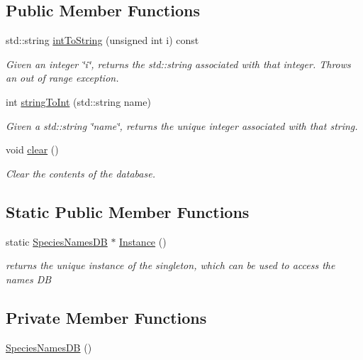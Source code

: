 \subsection*{Public Member Functions}
\begin{DoxyCompactItemize}
\item 
std\-::string \hyperlink{classchem_1_1SpeciesNamesDB_ab4bd884d41961450ebe3d4d9564893a9}{int\-To\-String} (unsigned int i) const 
\begin{DoxyCompactList}\small\item\em Given an integer \char`\"{}i\char`\"{}, returns the std\-::string associated with that integer. Throws an out of range exception. \end{DoxyCompactList}\item 
int \hyperlink{classchem_1_1SpeciesNamesDB_acbb96b1e9cc8fee95c5b5f1b464cd5bd}{string\-To\-Int} (std\-::string name)
\begin{DoxyCompactList}\small\item\em Given a std\-::string \char`\"{}name\char`\"{}, returns the unique integer associated with that string. \end{DoxyCompactList}\item 
void \hyperlink{classchem_1_1SpeciesNamesDB_a08f8ec17dd512073c80ac83064d9f2b9}{clear} ()
\begin{DoxyCompactList}\small\item\em Clear the contents of the database. \end{DoxyCompactList}\end{DoxyCompactItemize}
\subsection*{Static Public Member Functions}
\begin{DoxyCompactItemize}
\item 
static \hyperlink{classchem_1_1SpeciesNamesDB}{Species\-Names\-D\-B} $\ast$ \hyperlink{classchem_1_1SpeciesNamesDB_af7921b9f52c8ed078718821bdb993109}{Instance} ()
\begin{DoxyCompactList}\small\item\em returns the unique instance of the singleton, which can be used to access the names D\-B \end{DoxyCompactList}\end{DoxyCompactItemize}
\subsection*{Private Member Functions}
\begin{DoxyCompactItemize}
\item 
\hyperlink{classchem_1_1SpeciesNamesDB_aaacfec3074bc2318a67fc86477f4d1fd}{Species\-Names\-D\-B} ()
\end{DoxyCompactItemize}

